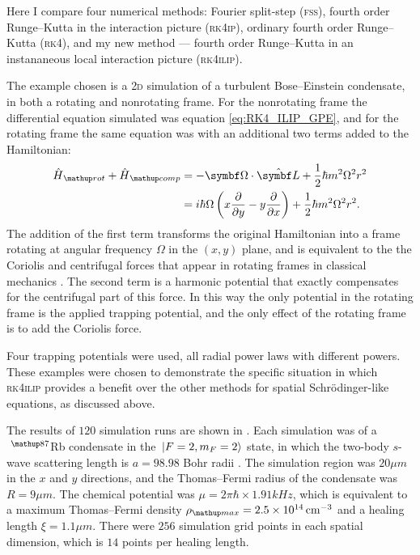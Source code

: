  Here I compare four numerical methods: Fourier split-step (\textsc{fss}), fourth order Runge--Kutta in the interaction picture (\textsc{rk4ip}), ordinary fourth order Runge--Kutta (\textsc{rk4}), and my new method --- fourth order Runge--Kutta in an instananeous local interaction picture (\textsc{rk4ilip}).

 The example chosen is a \textsc{2d} simulation of a turbulent Bose--Einstein condensate, in both a rotating and nonrotating frame. For the nonrotating frame the differential equation simulated was equation \eqref{eq:RK4_ILIP_GPE}, and for the rotating frame the same equation was with an additional two terms added to the Hamiltonian:
\begin{align}
\hat H_\up{rot} + \hat H_\up {comp} &= -\vec \Omega \cdot \hat{\vec L} +\frac12\hbar m^2\Omega^2 r^2\\
                &= i\hbar\Omega \left(x\pdv{y} - y\pdv{x}\right) +\frac12\hbar m^2\Omega^2 r^2.
\end{align}
The addition of the first term transforms the original Hamiltonian into a frame rotating at angular frequency $\Omega$ in the $(x, y)$ plane, and is equivalent to the the Coriolis and centrifugal forces that appear in rotating frames in classical mechanics \cite{Gulshani1978}. The second term is a harmonic potential that exactly compensates for the centrifugal part of this force. In this way the only potential in the rotating frame is the applied trapping potential, and the only effect of the rotating frame is to add the Coriolis force.

 Four trapping potentials were used, all radial power laws with different powers. These examples were chosen to demonstrate the specific situation in which \textsc{rk4ilip} provides a benefit over the other methods for spatial Schr\"odinger-like equations, as discussed above.

The results of $120$ simulation runs are shown in . Each simulation was of a $\ ^\up{87}$Rb condensate in the $\ket{F=2, m_F=2}$ state, in which the two-body $s$-wave scattering length is $a = 98.98$ Bohr radii \cite{vanKempen2002}. The simulation region was $20\unit{\mu m}$ in the $x$ and $y$ directions, and the Thomas--Fermi radius of the condensate was $R = 9\unit{\mu m}$.  The chemical potential was $\mu = 2\pi\hbar\times 1.91\unit{kHz}$, which is equivalent to a maximum Thomas--Fermi density $\rho_\up{max} = 2.5\E{14}\unit{cm}^{-3}$ and a healing length $\xi = 1.1\unit{\mu m}$. There were $256$ simulation grid points in each spatial dimension, which is $14$ points per healing length.

